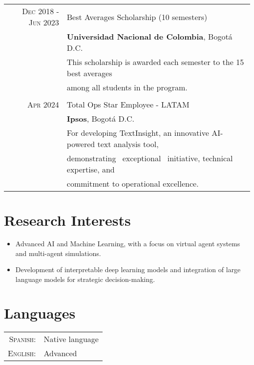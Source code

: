 \documentclass[a4paper,10pt]{article} %
\begin{document}
\begin{tabular}{r|l}
\textsc{Dec} 2018 - \textsc{Jun} 2023 & Best Averages Scholarship (10 semesters)\\
& \normalsize\textbf{Universidad Nacional de Colombia}, Bogotá D.C.\\
& This scholarship is awarded each semester to the 15 best averages \\& among all students in the program.\\
\\
\textsc{Apr} 2024 & Total Ops Star Employee - LATAM \\
& \normalsize\textbf{Ipsos}, Bogotá D.C.\\
& For developing TextInsight, an innovative AI-powered text analysis tool,  \\
& demonstrating \ exceptional \ initiative, technical expertise, and \\
& commitment to operational excellence.
\end{tabular}

\vspace{1em}
\section{Research Interests}
\begin{itemize}
    \item Advanced AI and Machine Learning, with a focus on virtual agent systems and multi-agent simulations.
    \item Development of interpretable deep learning models and integration of large language models for strategic decision-making.
\end{itemize}

\vspace{1em}
\section{Languages}

\begin{tabular}{rl}
\textsc{Spanish:} & Native language \\
\textsc{English:} & Advanced \\
\end{tabular}
\end{document}
